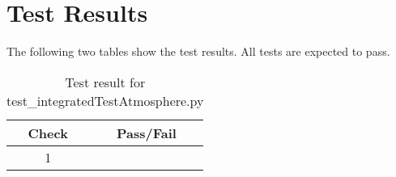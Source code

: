 \section{Test Results}
The following two tables show the test results.  All tests are expected to pass.


\begin{table}[H]
	\caption{Test result for test\_integratedTestAtmosphere.py}
	\label{tab:results}
	\centering \fontsize{10}{10}\selectfont
	\begin{tabular}{c  | c } %
		\hline\hline
		\textbf{Check} &  \textbf{Pass/Fail} \\ 
		\hline
		1 &   \\ 
		\hline
		\hline
	\end{tabular}
\end{table}


